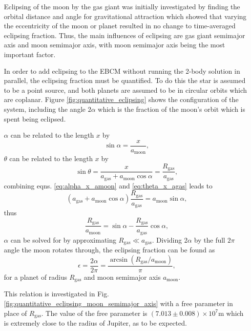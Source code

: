 \documentclass[12pt, onecolumn]{revtex4-2}    %
\begin{document}
Eclipsing of the moon by the gas giant was initially investigated by finding the orbital distance and angle  for gravitational attraction which showed that varying the eccentricity of the moon or planet resulted in no change to time-averaged eclipsing fraction.
Thus, the main influences of eclipsing are gas giant semimajor axis and moon semimajor axis, with moon semimajor axis being the most important factor.

In order to add eclipsing to the EBCM without running the 2-body solution in parallel, the eclipsing fraction must be quantified.
To do this the star is assumed to be a point source, and both planets are assumed to be in circular orbits which are coplanar.
Figure \ref{fig:quantitative_eclipsing} shows the configuration of the system, including the angle $2\alpha$ which is the fraction of the moon's orbit which is spent being eclipsed.

$\alpha$ can be related to the length $x$ by
\begin{equation}
  \sin \alpha = \frac{x}{a_\text{moon}}, \label{eq:alpha_x_amoon}
\end{equation}
$\theta$ can be related to the length $x$ by
\begin{equation}
  \sin \theta = \frac{x}{a_\text{gas} + a_\text{moon} \cos\alpha} = \frac{R_\text{gas}}{a_\text{gas}} , \label{eq:theta_x_agas}
\end{equation}
combining eqns. \eqref{eq:alpha_x_amoon} and \eqref{eq:theta_x_agas} leads to
\begin{equation}
  (a_\text{gas} + a_\text{moon}\cos\alpha) \frac{R_\text{gas}}{a_\text{gas}} = a_\text{moon} \sin\alpha,
\end{equation}
thus
\begin{equation}
  \frac{R_\text{gas}}{a_\text{moon}} = \sin\alpha - \frac{R_\text{gas}}{a_\text{gas}}\cos\alpha,
\end{equation}
$\alpha$ can be solved for by approximating $R_\text{gas} \ll a_\text{gas}$.
Dividing $2\alpha$ by the full $2\pi$ angle the moon rotates through, the eclipsing fraction can be found as
\begin{equation}
  \epsilon = \frac{2\alpha}{2\pi} = \frac{\arcsin(R_\text{gas} / a_\text{moon})}{\pi},
  \label{eq:eclipsing_fraction}
\end{equation}
for a planet of radius $R_\text{gas}$ and moon semimajor axis $a_\text{moon}$.

This relation is investigated in Fig. \ref{fig:quantitative_eclipsing_moon_semimajor_axis} with a free parameter in place of $R_\text{gas}$.
The value of the free parameter is $(7.013\pm 0.008) \times 10^7 \text{m}$ which is extremely close to the radius of Jupiter, as to be expected.
\end{document}
